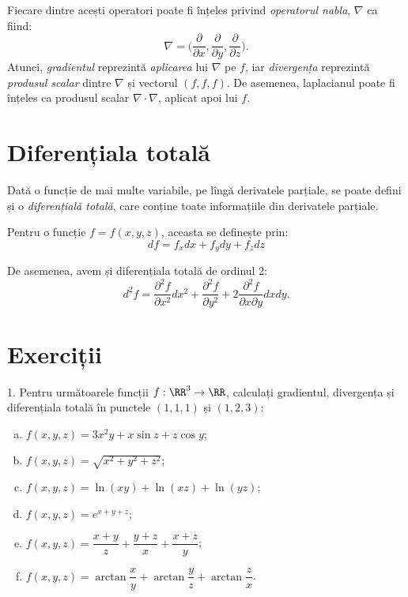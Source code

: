 Fiecare dintre acești operatori poate fi înțeles privind \emph{operatorul nabla},
$ \nabla $ ca fiind:
\[
  \nabla = \Big( \frac{\partial}{\partial x}, \frac{\partial}{\partial y}, %
  \frac{\partial}{\partial z} \Big).
\]
Atunci, \emph{gradientul} reprezintă \emph{aplicarea} lui $ \nabla $ pe $ f $,
iar \emph{divergența} reprezintă \emph{produsul scalar} dintre $ \nabla $
și vectorul $ (f, f, f) $. De asemenea, laplacianul poate fi înțeles ca
produsul scalar $ \nabla \cdot \nabla $, aplicat apoi lui $ f $.


\section{Diferențiala totală}
Dată o funcție de mai multe variabile, pe lîngă derivatele parțiale, se
poate defini și o \emph{diferențială totală}, care conține toate informațiile
din derivatele parțiale.

Pentru o funcție $ f = f(x, y, z) $, aceasta se definește prin:
\[
  df = f_x dx + f_y dy + f_z dz
\]

De asemenea, avem și diferențiala totală de ordinul 2:
\[
  d^2 f = \frac{\partial^2 f}{\partial x^2} dx^2 + \frac{\partial^2 f}{\partial y^2} + %
  2 \frac{\partial^2 f}{\partial x \partial y} dxdy.
\]


\section{Exerciții}

1. Pentru următoarele funcții $ f : \RR^3 \to \RR $, calculați
gradientul, divergența și diferențiala totală în punctele
$ (1, 1, 1) $ și $ (1, 2, 3) $:
\begin{enumerate}[(a)]
\item $ f(x, y, z) = 3x^2 y + x\sin z + z\cos y $;
\item $ f(x, y, z) = \sqrt{x^2 + y^2 + z^2} $;
\item $ f(x, y, z) = \ln(xy) + \ln(xz) + \ln(yz) $;
\item $ f(x, y, z) = e^{x + y + z} $;
\item $ f(x, y, z) = \dfrac{x + y}{z} + \dfrac{y + z}{x} + \dfrac{x + z}{y} $;
\item $ f(x, y, z) = \arctan \dfrac{x}{y} + \arctan \dfrac{y}{z} + \arctan \dfrac{z}{x} $.
\end{enumerate}

